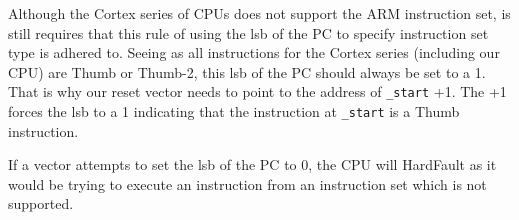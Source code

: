 Although the Cortex series of CPUs does not support the ARM instruction set, is still requires that this rule of using the lsb of the PC to specify instruction set type is adhered to. Seeing as all instructions for the Cortex series (including our CPU) are Thumb or Thumb-2, this lsb of the PC should always be set to a 1. That is why our reset vector needs to point to the address of \texttt{\_start} +1. The +1 forces the lsb to a 1 indicating that the instruction at \texttt{\_start} is a Thumb instruction. 

If a vector attempts to set the lsb of the PC to 0, the CPU will HardFault as it would be trying to execute an instruction from an instruction set which is not supported. 
